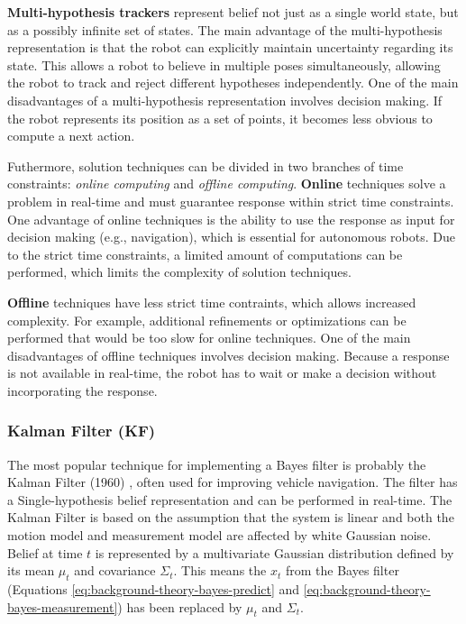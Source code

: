 \textbf{Multi-hypothesis trackers} represent belief not just as a single world state, but as a possibly infinite set of states.
The main advantage of the multi-hypothesis representation is that the robot can explicitly maintain uncertainty regarding its state.
This allows a robot to believe in multiple poses simultaneously, allowing the robot to track and reject different hypotheses independently.
One of the main disadvantages of a multi-hypothesis representation involves decision making.
If the robot represents its position as a set of points, it becomes less obvious to compute a next action.

Futhermore, solution techniques can be divided in two branches of time constraints: \textit{online computing} and \textit{offline computing}.
\textbf{Online} techniques solve a problem in real-time and must guarantee response within strict time constraints.
One advantage of online techniques is the ability to use the response as input for decision making (e.g., navigation), which is essential for autonomous robots.
Due to the strict time constraints, a limited amount of computations can be performed, which limits the complexity of solution techniques.

\textbf{Offline} techniques have less strict time contraints, which allows increased complexity.
For example, additional refinements or optimizations can be performed that would be too slow for online techniques.
One of the main disadvantages of offline techniques involves decision making.
Because a response is not available in real-time, the robot has to wait or make a decision without incorporating the response.


\subsubsection{Kalman Filter (KF)}
The most popular technique for implementing a Bayes filter is probably the Kalman Filter (1960) \cite{kalman1960new}, often used for improving vehicle navigation.
The filter has a Single-hypothesis belief representation and can be performed in real-time.
The Kalman Filter is based on the assumption that the system is linear and both the motion model and measurement model are affected by white Gaussian noise.
Belief at time $t$ is represented by a multivariate Gaussian distribution defined by its mean $\mu_t$ and covariance $\Sigma_t$.
This means the $x_t$ from the Bayes filter (Equations \eqref{eq:background-theory-bayes-predict} and \eqref{eq:background-theory-bayes-measurement}) has been replaced by $\mu_t$ and $\Sigma_t$.

